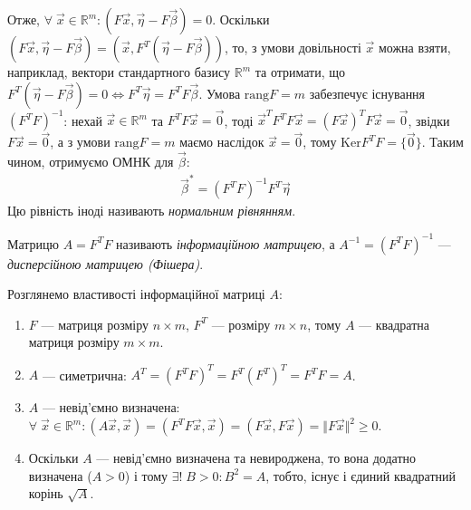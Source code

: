 Отже, $\forall\; \vec{x} \in \mathbb{R}^m: \left(F\vec{x}, \vec{\eta} - F \vec{\beta}\right) = 0$.
Оскільки $\left(F\vec{x}, \vec{\eta} - F \vec{\beta}\right) = \left(\vec{x}, F^T (\vec{\eta} - F \vec{\beta})\right)$,
то, з умови довільності $\vec{x}$ можна взяти, наприклад, вектори стандартного базису $\mathbb{R}^m$ та
отримати, що $F^T (\vec{\eta} - F \vec{\beta}) = 0 \Leftrightarrow F^T \vec{\eta} = F^T F \vec{\beta}$.
Умова $\mathrm{rang}{F} = m$ забезпечує існування $(F^T F)^{-1}$: нехай $\vec{x} \in \mathbb{R}^m$ та 
$F^T F \vec{x} = \vec{0}$, тоді $\vec{x}^T F^T F \vec{x} = (F\vec{x})^T F\vec{x} = \vec{0}$,
звідки $F\vec{x} = \vec{0}$, а з умови $\mathrm{rang}{F} = m$ маємо наслідок $\vec{x} = \vec{0}$,
тому $\mathrm{Ker} F^T F = \{ \vec{0}\}$.
Таким чином, отримуємо ОМНК для $\vec{\beta}$:
\begin{gather}\label{regr_coef}
    \vec{\beta}^* = (F^T F)^{-1} F^T \vec{\eta}
\end{gather}
Цю рівність іноді називають \emph{нормальним рівнянням}. 
\begin{definition}
    Матрицю $A = F^T F$ називають \emph{інформаційною матрицею}, а $A^{-1} = 
    (F^T F)^{-1}$ --- \emph{дисперсійною матрицею (Фішера)}.
\end{definition}
Розглянемо властивості інформаційної матриці $A$:
\begin{enumerate}
    \item $F$ --- матриця розміру $n \times m$, $F^T$ --- розміру $m \times n$, тому
    $A$ --- квадратна матриця розміру $m \times m$.
    \item $A$ --- симетрична: $A^T = (F^T F)^T = F^T (F^T)^T = F^T F = A$.
    \item $A$ --- невід'ємно визначена: $\forall \; \vec{x} \in \mathbb{R}^m : \left(A\vec{x}, \vec{x}\right) = \left(F^T F \vec{x}, \vec{x}\right) = \left(F\vec{x}, F\vec{x}\right) = \Vert F \vec{x}\Vert^2 \geq 0$.
    \item Оскільки $A$ --- невід'ємно визначена та невироджена, то вона додатно визначена ($A > 0$) і тому $\exists! \; B > 0 :  B^2 = A$,
    тобто, існує і єдиний квадратний корінь $\sqrt{A}$.
\end{enumerate}
